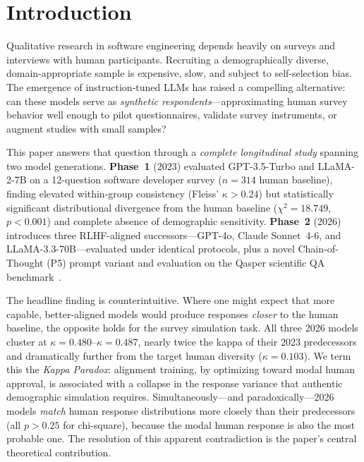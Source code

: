 \documentclass[sigconf,nonacm]{acmart}
\newcommand{\kp}{\textit{Kappa Paradox}\xspace}
\newcommand{\kval}[1]{$\kappa{=}#1$}
\begin{document}
\maketitle

\section{Introduction}
\label{sec:intro}

Qualitative research in software engineering depends heavily on surveys and
interviews with human participants.
Recruiting a demographically diverse, domain-appropriate sample is expensive,
slow, and subject to self-selection bias.
The emergence of instruction-tuned LLMs has raised a compelling alternative:
can these models serve as \emph{synthetic respondents}---approximating human
survey behavior well enough to pilot questionnaires, validate survey
instruments, or augment studies with small samples?

This paper answers that question through a \emph{complete longitudinal study}
spanning two model generations.
\textbf{Phase~1} (2023) evaluated GPT-3.5-Turbo and LLaMA-2-7B on a
12-question software developer survey ($n{=}314$ human baseline), finding
elevated within-group consistency (Fleiss' $\kappa > 0.24$) but statistically
significant distributional divergence from the human baseline
($\chi^2{=}18.749$, $p{<}0.001$) and complete absence of demographic
sensitivity.
\textbf{Phase~2} (2026) introduces three RLHF-aligned successors---GPT-4o,
Claude Sonnet~4-6, and LLaMA-3.3-70B---evaluated under identical protocols,
plus a novel Chain-of-Thought (P5) prompt variant and evaluation on the
Qasper scientific QA benchmark~\cite{dasigi2021}.

The headline finding is counterintuitive.
Where one might expect that more capable, better-aligned models would produce
responses \emph{closer} to the human baseline, the opposite holds for the
survey simulation task.
All three 2026 models cluster at \kval{0.480}--\kval{0.487}, nearly twice
the kappa of their 2023 predecessors and dramatically further from the
target human diversity (\kval{0.103}).
We term this the \kp: alignment training, by optimizing toward modal human
approval, is associated with a collapse in the response variance that
authentic demographic simulation requires.
Simultaneously---and paradoxically---2026 models \emph{match} human
response distributions more closely than their predecessors (all $p{>}0.25$
for chi-square), because the modal human response is also the most probable
one.
The resolution of this apparent contradiction is the paper's central
theoretical contribution.
\end{document}
